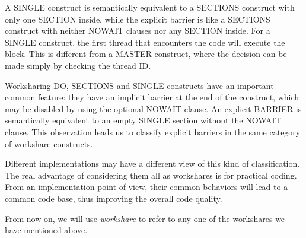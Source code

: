 A SINGLE construct is semantically equivalent to a SECTIONS construct
with only one SECTION inside, while the explicit barrier is like a
SECTIONS construct with neither NOWAIT clauses nor any SECTION inside.
For a SINGLE construct, the first thread that encounters the code will
execute the block. This is different from a MASTER construct, where
the decision can be made simply by checking the thread ID.

Worksharing DO, SECTIONS and SINGLE constructs have an important common
feature: they have an implicit barrier at the end of the construct,
which may be disabled by using the optional NOWAIT clause. An explicit
BARRIER is semantically equivalent to an empty SINGLE section without
the NOWAIT clause. This observation leads us to classify explicit
barriers in the same category of workshare constructs.

Different implementations may have a different view of this kind of
classification. The real advantage of considering them all as
workshares is for practical coding. From an implementation point of
view, their common behaviors will lead to a common code base, thus
improving the overall code quality.

From now on, we will use \emph{workshare} to refer to any one of the
workshares we have mentioned above.

